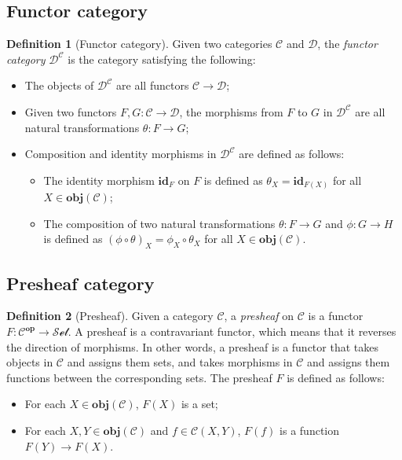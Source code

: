 \documentclass[12pt,a4paper]{report}
\theoremstyle{definition}
\newtheorem{definition}{Definition}[chapter]
\begin{document}
        \subsection{Functor category}
        \begin{definition}[Functor category]
            Given two categories $\mathcal{C}$ and $\mathcal{D}$, the \emph{functor category} $\mathcal{D}^{\mathcal{C}}$ is the category satisfying the following:
            \begin{itemize}
                \item 
                    The objects of $\mathcal{D}^{\mathcal{C}}$ are all functors $\mathcal{C} \to \mathcal{D}$;
                \item 
                    Given two functors $F,G: \mathcal{C} \to \mathcal{D}$, the morphisms from $F$ to $G$ in $\mathcal{D}^{\mathcal{C}}$ are all natural transformations $\theta : F \to G$;
                \item
                    Composition and identity morphisms in $\mathcal{D}^{\mathcal{C}}$ are defined as follows:
                    \begin{itemize}
                        \item 
                            The identity morphism $\textbf{id}_F$ on $F$ is defined as $\theta_X = \textbf{id}_{F(X)}$ for all $X \in \textbf{obj}(\mathcal{C})$;
                        \item
                            The composition of two natural transformations $\theta : F \to G$ and $\phi : G \to H$ is defined as $(\phi \circ \theta)_X = \phi_X \circ \theta_X$ for all $X \in \textbf{obj}(\mathcal{C})$.
                    \end{itemize}
            \end{itemize}
        \end{definition}

        \subsection{Presheaf category}
        \begin{definition}[Presheaf]
            Given a category $\mathcal{C}$, a \emph{presheaf} on $\mathcal{C}$ is a functor $F: \mathcal{C}^{\textbf{op}} \to \mathcal{Set}$.
            A presheaf is a contravariant functor, which means that it reverses the direction of morphisms.
            In other words, a presheaf is a functor that takes objects in $\mathcal{C}$ and assigns them sets, and takes morphisms in $\mathcal{C}$ and assigns them functions between the corresponding sets.
            The presheaf $F$ is defined as follows:
            \begin{itemize}
                \item 
                    For each $X \in \textbf{obj}(\mathcal{C})$, $F(X)$ is a set;
                \item
                    For each $X, Y \in \textbf{obj}(\mathcal{C})$ and $f \in \mathcal{C}{(X,Y)}$, $F(f)$ is a function $F(Y) \to F(X)$.
            \end{itemize}
        \end{definition}
\end{document}
